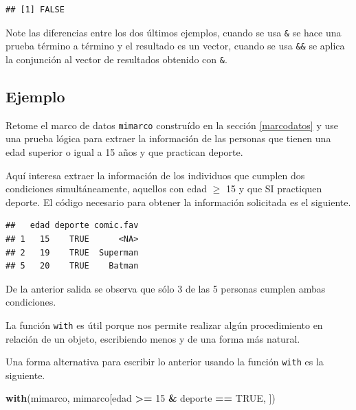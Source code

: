 \documentclass[10pt,]{krantz}
\makeatletter
\newenvironment{Shaded}{\begin{snugshade}}{\end{snugshade}}
\newcommand{\KeywordTok}[1]{\textcolor[rgb]{0.13,0.29,0.53}{\textbf{#1}}}
\newcommand{\DecValTok}[1]{\textcolor[rgb]{0.00,0.00,0.81}{#1}}
\newcommand{\StringTok}[1]{\textcolor[rgb]{0.31,0.60,0.02}{#1}}
\newcommand{\OtherTok}[1]{\textcolor[rgb]{0.56,0.35,0.01}{#1}}
\newcommand{\OperatorTok}[1]{\textcolor[rgb]{0.81,0.36,0.00}{\textbf{#1}}}
\newcommand{\NormalTok}[1]{#1}
\newenvironment{kframe}{%
\medskip{}
\setlength{\fboxsep}{.8em}
 \def\at@end@of@kframe{}%
 \ifinner\ifhmode%
  \def\at@end@of@kframe{\end{minipage}}%
  \begin{minipage}{\columnwidth}%
 \fi\fi%
 \def\FrameCommand##1{\hskip\@totalleftmargin \hskip-\fboxsep
 \colorbox{shadecolor}{##1}\hskip-\fboxsep
     \hskip-\linewidth \hskip-\@totalleftmargin \hskip\columnwidth}%
 \MakeFramed {\advance\hsize-\width
   \@totalleftmargin\z@ \linewidth\hsize
   \@setminipage}}%
 {\par\unskip\endMakeFramed%
 \at@end@of@kframe}
\renewenvironment{Shaded}{\begin{kframe}}{\end{kframe}}
\let\BeginKnitrBlock\begin \let\EndKnitrBlock\end
\makeatother
\begin{document}
\begin{verbatim}
## [1] FALSE
\end{verbatim}

Note las diferencias entre los dos últimos ejemplos, cuando se usa
\texttt{\&} se hace una prueba término a término y el resultado es un
vector, cuando se usa \texttt{\&\&} se aplica la conjunción al vector de
resultados obtenido con \texttt{\&}.

\subsection*{Ejemplo}\label{ejemplo-8}


Retome el marco de datos \texttt{mimarco} construído en la sección
\ref{marcodatos} y use una prueba lógica para extraer la información de
las personas que tienen una edad superior o igual a 15 años y que
practican deporte.

Aquí interesa extraer la información de los individuos que cumplen dos
condiciones simultáneamente, aquellos con edad \(\geq\) 15 y que SI
practiquen deporte. El código necesario para obtener la información
solicitada es el siguiente.

\begin{Shaded}
\end{Shaded}

\begin{verbatim}
##   edad deporte comic.fav
## 1   15    TRUE      <NA>
## 2   19    TRUE  Superman
## 5   20    TRUE    Batman
\end{verbatim}

De la anterior salida se observa que sólo 3 de las 5 personas cumplen
ambas condiciones.

 \BeginKnitrBlock{rmdtip}

La función \texttt{with} es útil porque nos permite realizar algún
procedimiento en relación de un objeto, escribiendo menos y de una forma
más natural.
\EndKnitrBlock{rmdtip}

Una forma alternativa para escribir lo anterior usando la función
\texttt{with} es la siguiente.

\begin{Shaded}
\begin{Highlighting}[]
\KeywordTok{with}\NormalTok{(mimarco, mimarco[edad }\OperatorTok{>=}\StringTok{ }\DecValTok{15} \OperatorTok{&}\StringTok{ }\NormalTok{deporte }\OperatorTok{==}\StringTok{ }\OtherTok{TRUE}\NormalTok{, ])}
\end{Highlighting}
\end{Shaded}
\end{document}
